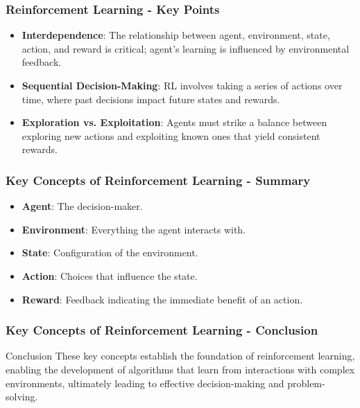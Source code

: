 \documentclass[aspectratio=169]{beamer}
\begin{document}
\begin{frame}[fragile]
    \frametitle{Reinforcement Learning - Key Points}
    \begin{itemize}
        \item \textbf{Interdependence}: The relationship between agent, environment, state, action, and reward is critical; agent's learning is influenced by environmental feedback.
        
        \item \textbf{Sequential Decision-Making}: RL involves taking a series of actions over time, where past decisions impact future states and rewards.
        
        \item \textbf{Exploration vs. Exploitation}: Agents must strike a balance between exploring new actions and exploiting known ones that yield consistent rewards.
    \end{itemize}
\end{frame}

\begin{frame}[fragile]
    \frametitle{Key Concepts of Reinforcement Learning - Summary}
    \begin{itemize}
        \item \textbf{Agent}: The decision-maker.
        \item \textbf{Environment}: Everything the agent interacts with.
        \item \textbf{State}: Configuration of the environment.
        \item \textbf{Action}: Choices that influence the state.
        \item \textbf{Reward}: Feedback indicating the immediate benefit of an action.
    \end{itemize}
\end{frame}

\begin{frame}[fragile]
    \frametitle{Key Concepts of Reinforcement Learning - Conclusion}
    \begin{block}{Conclusion}
        These key concepts establish the foundation of reinforcement learning, enabling the development of algorithms that learn from interactions with complex environments, ultimately leading to effective decision-making and problem-solving.
    \end{block}
\end{frame}
\end{document}
